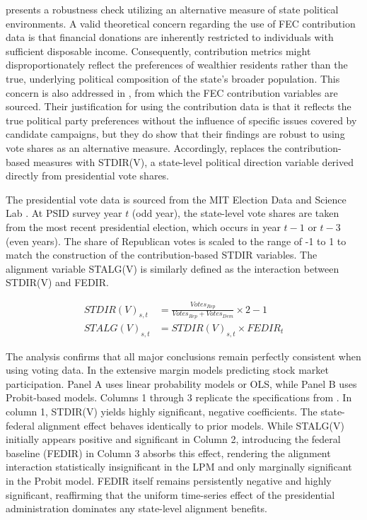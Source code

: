  presents a robustness check utilizing an alternative measure of state political environments. A valid theoretical concern regarding the use of FEC contribution data is that financial donations are inherently restricted to individuals with sufficient disposable income. Consequently, contribution metrics might disproportionately reflect the preferences of wealthier residents rather than the true, underlying political composition of the state's broader population. This concern is also addressed in \citet{meeuwis2022}, from which the FEC contribution variables are sourced. Their justification for using the contribution data is that it reflects the true political party preferences without the influence of specific issues covered by candidate campaigns, but they do show that their findings are robust to using vote shares as an alternative measure. Accordingly,  replaces the contribution-based measures with STDIR(V), a state-level political direction variable derived directly from presidential vote shares.

The presidential vote data is sourced from the MIT Election Data and Science Lab \citep{votesdb}. At PSID survey year $t$ (odd year), the state-level vote shares are taken from the most recent presidential election, which occurs in year $t-1$ or $t-3$ (even years). The share of Republican votes is scaled to the range of -1 to 1 to match the construction of the contribution-based STDIR variables. The alignment variable STALG(V) is similarly defined as the interaction between STDIR(V) and FEDIR.

\begin{align*}
    STDIR(V)_{s,t} &= \frac{Votes_{Rep} }{Votes_{Rep} + Votes_{Dem}} \times 2 - 1 \\
    STALG(V)_{s,t} &= STDIR(V)_{s,t} \times FEDIR_t
\end{align*}


The analysis confirms that all major conclusions remain perfectly consistent when using voting data. In the extensive margin models predicting stock market participation. Panel A uses linear probability models or OLS, while Panel B uses Probit-based models. Columns 1 through 3 replicate the specifications from .
In column 1, STDIR(V) yields highly significant, negative coefficients. The state-federal alignment effect behaves identically to prior models. While STALG(V) initially appears positive and significant in Column 2, introducing the federal baseline (FEDIR) in Column 3 absorbs this effect, rendering the alignment interaction statistically insignificant in the LPM and only marginally significant in the Probit model. FEDIR itself remains persistently negative and highly significant, reaffirming that the uniform time-series effect of the presidential administration dominates any state-level alignment benefits.

